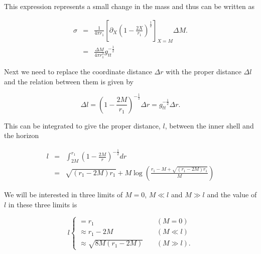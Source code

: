 \documentclass[aps,showpacs,onecolumn,floats,prd,superscriptaddress,nofootinbib]{revtex4-1}
\begin{document}
This expression represents a small change in the mass and thus can be written as

\begin{eqnarray}
	\sigma & = & \frac{1}{4 \pi r_1} \left[ \partial_X \left( 1 - \frac{2X}{r_1} \right)^\frac{1}{2} \right]_{X = M} \Delta M. \nonumber	\\
	& = &  \frac{\Delta M}{4 \pi r_1^2} g_{tt}^{-\frac{1}{2}}	\label{sig-Dm}
\end{eqnarray}

Next we need to replace the coordinate distance $\Delta r$ with the proper distance $\Delta l$ and the relation between them is given by

\begin{equation}
	\Delta l = \left( 1 - \frac{2M}{r_1} \right)^{-\frac{1}{2}} \Delta r = g_{tt}^{-\frac{1}{2}} \Delta r.	\label{Dl-Dr}
\end{equation}

This can be integrated to give the proper distance, $l$, between the inner shell and the horizon

\begin{eqnarray}
	l & = & \int^{r_1}_{2M} \left( 1 - \frac{2M}{r} \right)^{-\frac{1}{2}} dr	\nonumber	\\
	& = & \sqrt{(r_1 - 2M)r_1} + M \log \left( \frac{ r_1 - M + \sqrt{(r_1 - 2M)r_1}}{M} \right)	\label{l-r}
\end{eqnarray}

We will be interested in three limits of $M=0$, $M \ll l$ and $M \gg l$ and the value of $l$ in these three limits is

\begin{equation}
l \begin{cases}
= r_1	 &\ \ \ \ \ (M = 0)\\
\approx r_1 - 2M & \ \ \ \ \ (M \ll l)	\\
\approx \sqrt{8M(r_1 - 2M)} & \ \ \ \ \ (M \gg l).
\end{cases}	
\end{equation}
\end{document}

